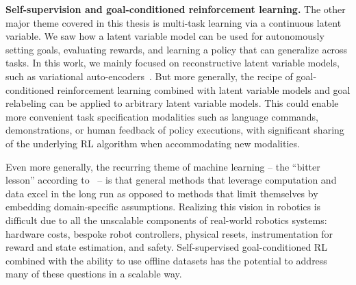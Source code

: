 \vspace{5mm}

\textbf{Self-supervision and goal-conditioned reinforcement learning.} 
The other major theme covered in this thesis is multi-task learning via a continuous latent variable.
We saw how a latent variable model can be used for autonomously setting goals, evaluating rewards, and learning a policy that can generalize across tasks.
In this work, we mainly focused on reconstructive latent variable models, such as variational auto-encoders~\cite{kingma2014vae}.
But more generally, the recipe of goal-conditioned reinforcement learning combined with latent variable models and goal relabeling can be applied to arbitrary latent variable models.
This could enable more convenient task specification modalities such as language commands, demonstrations, or human feedback of policy executions, with significant sharing of the underlying RL algorithm when accommodating new modalities.

Even more generally, the recurring theme of machine learning -- the ``bitter lesson'' according to~\citet{sutton2019bitter} -- is that general methods that leverage computation and data excel in the long run as opposed to methods that limit themselves by embedding domain-specific assumptions.
Realizing this vision in robotics is difficult due to all the unscalable components of real-world robotics systems: hardware costs, bespoke robot controllers, physical resets, instrumentation for reward and state estimation, and safety.
Self-supervised goal-conditioned RL combined with the ability to use offline datasets has the potential to address many of these questions in a scalable way.